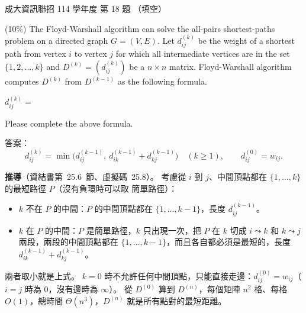 \begin{pastexam}[label={px:ncku-114-prog-18}]{成大資訊聯招 114 學年度 第 18 題}
（填空）

(10\%) The Floyd-Warshall algorithm can solve the all-pairs shortest-paths problem on a directed graph $G=(V,E)$. Let $d_{ij}^{(k)}$ be the weight of a shortest path from vertex $i$ to vertex $j$ for which all intermediate vertices are in the set $\{1,2,\ldots,k\}$ and $D^{(k)}=\left(d_{ij}^{(k)}\right)$ be a $n\times n$ matrix. Floyd-Warshall algorithm computes $D^{(k)}$ from $D^{(k-1)}$ as the following formula.

$d_{ij}^{(k)}=$\underline{\hspace{5cm}}

Please complete the above formula.
\end{pastexam}

\begin{pastsoln}
答案：
\[
d_{ij}^{(k)} = \min\bigl(d_{ij}^{(k-1)},\ d_{ik}^{(k-1)} + d_{kj}^{(k-1)}\bigr) \quad (k \ge 1), \qquad d_{ij}^{(0)} = w_{ij}.
\]

\textbf{推導}（資結書第~25.6~節、虛擬碼~25.8）。 考慮從 $i$ 到 $j$、中間頂點都在 $\{1, \ldots, k\}$ 的最短路徑 $P$（沒有負環時可以取
簡單路徑）：
\begin{itemize}
\item $k$ 不在 $P$ 的中間：$P$ 的中間頂點都在 $\{1, \ldots, k-1\}$，長度 $d_{ij}^{(k-1)}$。
\item $k$ 在 $P$ 的中間：$P$ 是簡單路徑，$k$ 只出現一次，把 $P$ 在 $k$ 切成 $i \leadsto k$ 和 $k \leadsto j$ 兩段，兩段的中間頂點都在
$\{1, \ldots, k-1\}$，而且各自都必須是最短的，長度 $d_{ik}^{(k-1)} + d_{kj}^{(k-1)}$。
\end{itemize}
兩者取小就是上式。 $k = 0$ 時不允許任何中間頂點，只能直接走邊：$d_{ij}^{(0)} = w_{ij}$（$i = j$ 時為 $0$，沒有邊時為 $\infty$）。
從 $D^{(0)}$ 算到 $D^{(n)}$，每個矩陣 $n^2$ 格、每格 $O(1)$，總時間 $\Theta(n^3)$，$D^{(n)}$ 就是所有點對的最短距離。
\end{pastsoln}
